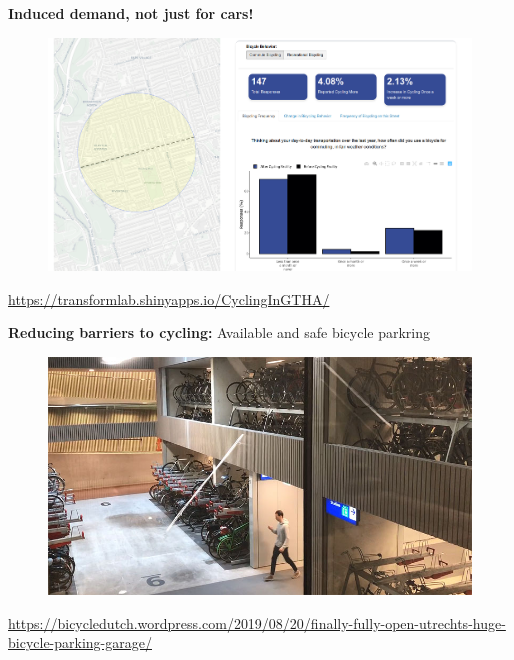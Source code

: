 \documentclass[aspectratio=169]{beamer}
\begin{document}
\begin{frame}
	
	\textbf{Induced demand, not just for cars!}
	
	\begin{figure}
		\centering
		\includegraphics[width=0.95\linewidth]{images/ryerson_cycle_danforth.png}
	\end{figure}
	
	\tiny\url{https://transformlab.shinyapps.io/CyclingInGTHA/}
	
\end{frame}





\begin{frame}
	
	\textbf{Reducing barriers to cycling:} Available and safe bicycle parkring
	
	\begin{figure}
		\centering
		\includegraphics[width=0.85\linewidth]{images/bike_parking_neth.jpg}
	\end{figure}
	
	\tiny\url{https://bicycledutch.wordpress.com/2019/08/20/finally-fully-open-utrechts-huge-bicycle-parking-garage/}
	
\end{frame}
\end{document}
